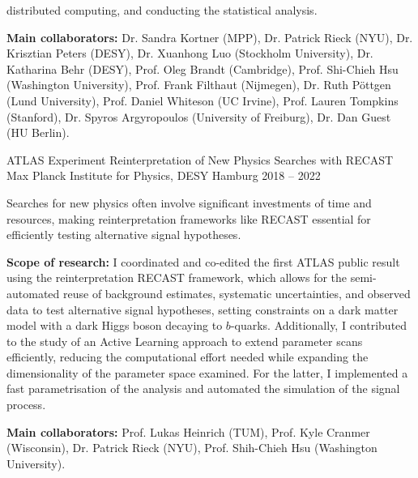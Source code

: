 \begin{cventries}
{\begin{cvitems}
        distributed computing, and conducting the statistical analysis.
        \item \textbf{Main collaborators:} Dr. Sandra Kortner (MPP), Dr. Patrick Rieck (NYU), Dr. Krisztian Peters (DESY), Dr. Xuanhong Luo (Stockholm University), Dr. Katharina Behr (DESY), Prof. Oleg Brandt (Cambridge), Prof. Shi-Chieh Hsu (Washington University), Prof. Frank Filthaut
        (Nijmegen), Dr. Ruth Pöttgen (Lund University), Prof. Daniel Whiteson (UC Irvine), Prof. Lauren Tompkins (Stanford), Dr. Spyros Argyropoulos (University of Freiburg), Dr. Dan Guest (HU Berlin).
      \end{cvitems}
    }

  \cventry
    {ATLAS Experiment} %
    {Reinterpretation of New Physics Searches with RECAST} %
    {Max Planck Institute for Physics, DESY Hamburg} %
    {2018 -- 2022} %
    {
      \begin{cvitems} %
        \item {Searches for new physics often involve significant investments of time and resources, making reinterpretation frameworks like RECAST essential for efficiently testing alternative signal hypotheses.}
        \item \textbf{Scope of research:} I coordinated and co-edited the first ATLAS public result using the reinterpretation RECAST framework, which allows for the semi-automated reuse of background estimates,
        systematic uncertainties, and observed data to test alternative signal hypotheses, setting
        constraints on a dark matter model with a dark Higgs boson decaying to \(b\)-quarks.
        Additionally, I contributed to the study of an Active Learning approach to extend parameter
        scans efficiently, reducing the computational effort needed while expanding the dimensionality
        of the parameter space examined. For the latter, I implemented a fast parametrisation of the
        analysis and automated the simulation of the signal process.
        \item \textbf{Main collaborators:} Prof. Lukas Heinrich (TUM), Prof. Kyle Cranmer (Wisconsin),
        Dr. Patrick Rieck (NYU), Prof. Shih-Chieh Hsu (Washington University).
      \end{cvitems}
    }


\end{cventries}
